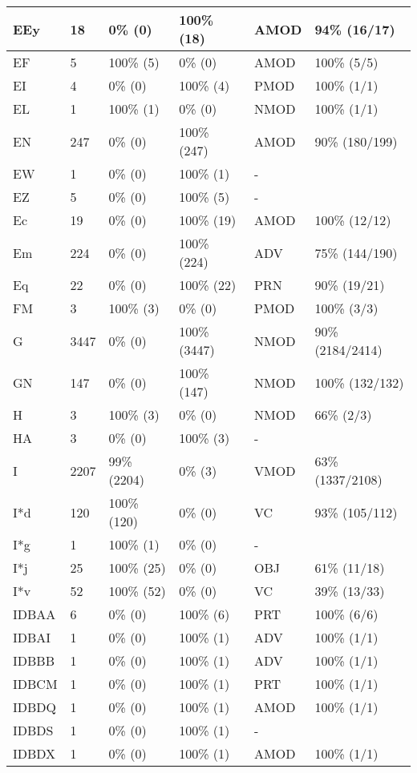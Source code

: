 \begin{figure*}
\begin{tabular}{|l|l|l|l||l|l|}
\hline
 EEy & 18 & 0\% (0) & 100\% (18) & AMOD & 94\% (16/17) \\ 
\hline
 EF & 5 & 100\% (5) & 0\% (0) & AMOD & 100\% (5/5) \\ 
\hline
 EI & 4 & 0\% (0) & 100\% (4) & PMOD & 100\% (1/1) \\ 
\hline
 EL & 1 & 100\% (1) & 0\% (0) & NMOD & 100\% (1/1) \\ 
\hline
 EN & 247 & 0\% (0) & 100\% (247) & AMOD & 90\% (180/199) \\ 
\hline
 EW & 1 & 0\% (0) & 100\% (1) & - &  \\ 
\hline
 EZ & 5 & 0\% (0) & 100\% (5) & - &  \\ 
\hline
 Ec & 19 & 0\% (0) & 100\% (19) & AMOD & 100\% (12/12) \\ 
\hline
 Em & 224 & 0\% (0) & 100\% (224) & ADV & 75\% (144/190) \\ 
\hline
 Eq & 22 & 0\% (0) & 100\% (22) & PRN & 90\% (19/21) \\ 
\hline
 FM & 3 & 100\% (3) & 0\% (0) & PMOD & 100\% (3/3) \\ 
\hline
 G & 3447 & 0\% (0) & 100\% (3447) & NMOD & 90\% (2184/2414) \\ 
\hline
 GN & 147 & 0\% (0) & 100\% (147) & NMOD & 100\% (132/132) \\ 
\hline
 H & 3 & 100\% (3) & 0\% (0) & NMOD & 66\% (2/3) \\ 
\hline
 HA & 3 & 0\% (0) & 100\% (3) & - &  \\ 
\hline
 I & 2207 & 99\% (2204) & 0\% (3) & VMOD & 63\% (1337/2108) \\ 
\hline
 I*d & 120 & 100\% (120) & 0\% (0) & VC & 93\% (105/112) \\ 
\hline
 I*g & 1 & 100\% (1) & 0\% (0) & - &  \\ 
\hline
 I*j & 25 & 100\% (25) & 0\% (0) & OBJ & 61\% (11/18) \\ 
\hline
 I*v & 52 & 100\% (52) & 0\% (0) & VC & 39\% (13/33) \\ 
\hline
 IDBAA & 6 & 0\% (0) & 100\% (6) & PRT & 100\% (6/6) \\ 
\hline
 IDBAI & 1 & 0\% (0) & 100\% (1) & ADV & 100\% (1/1) \\ 
\hline
 IDBBB & 1 & 0\% (0) & 100\% (1) & ADV & 100\% (1/1) \\ 
\hline
 IDBCM & 1 & 0\% (0) & 100\% (1) & PRT & 100\% (1/1) \\ 
\hline
 IDBDQ & 1 & 0\% (0) & 100\% (1) & AMOD & 100\% (1/1) \\ 
\hline
 IDBDS & 1 & 0\% (0) & 100\% (1) & - &  \\ 
\hline
 IDBDX & 1 & 0\% (0) & 100\% (1) & AMOD & 100\% (1/1) \\ 
\hline
\end{tabular}
\end{figure*}
